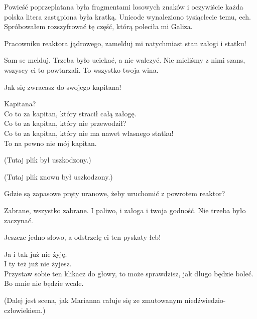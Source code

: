 Powieść poprzeplatana była fragmentami losowych znaków i oczywiście każda polska litera zastąpiona była kratką. 
Unicode wynaleziono tysiąclecie temu, ech.
Spróbowałem rozszyfrować tę część, którą poleciła mi Galiza.

\begin{poem}
	
	\charkap{}
	Pracowniku reaktora jądrowego, zamelduj mi natychmiast stan załogi i statku!
	
	\charkos{}
	Sam se melduj. Trzeba było uciekać, a nie walczyć.
	Nie mieliśmy z nimi szans, wszyscy ci to powtarzali.
	To wszystko twoja wina.
	
	\charkap{}
	Jak się zwracasz do swojego kapitana!
	
	\charkos{}
	Kapitana? \\
	Co to za kapitan, który stracił całą załogę. \\
	Co to za kapitan, który nie przewodził? \\
	Co to za kapitan, który nie ma nawet własnego statku! \\
	To na pewno nie mój kapitan.
\end{poem}
	(Tutaj plik był uszkodzony.)
\begin{poem}
\end{poem}
	(Tutaj plik znowu był uszkodzony.)
\begin{poem}
	Gdzie są zapasowe pręty uranowe, żeby uruchomić z powrotem reaktor?
	
	\charkos{}
	Zabrane, wszystko zabrane.
	I paliwo, i załoga i twoja godność.
	Nie trzeba było zaczynać.
	
	\charkap{}
	Jeszcze jedno słowo, a odstrzelę ci ten pyskaty łeb!
	
	\charkos{}
	Ja i tak już nie żyję. \\
	I ty też już nie żyjesz. \\
	Przystaw sobie ten klikacz do głowy, to może sprawdzisz, jak długo będzie boleć. \\
	Bo mnie nie będzie wcale.
	
	
	(Dalej jest scena, jak Marianna całuje się ze zmutowanym niedźwiedzio-człowiekiem.)
\end{poem}

